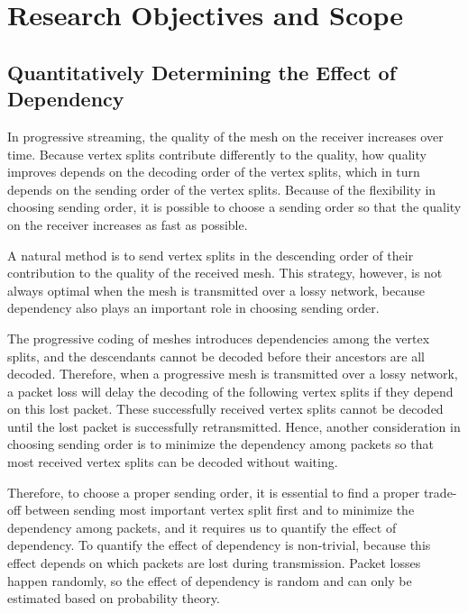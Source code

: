 \documentclass[11pt, a4paper]{report}
\begin{document}
  \section{Research Objectives and Scope}
  \label{s:intro:objectives}
    \subsection{Quantitatively Determining the Effect of Dependency}
    In progressive streaming, the quality of the mesh on the receiver
    increases over time.
    Because vertex splits contribute differently to the quality, 
    how quality improves
    depends on the decoding order of the vertex splits,
    which in turn depends on the sending order of the vertex splits.
    Because of the flexibility in choosing sending order,
    it is possible to choose a sending order so that the 
    quality on the receiver increases as fast as possible.

    A natural method is to send vertex splits in the descending order
    of their contribution to the quality of the received mesh. 
    This strategy, however, is not always optimal 
    when the mesh is transmitted over a lossy network,
    because dependency also plays an important role in choosing sending order.
    
    The progressive coding of meshes introduces dependencies among 
    the vertex splits, and the descendants cannot be decoded
    before their ancestors are all decoded. Therefore, 
    when a progressive mesh is transmitted over a lossy network,
    a packet loss will delay the decoding of the following
    vertex splits if they depend on this lost packet. 
    These successfully received vertex splits cannot be 
    decoded until the lost packet is successfully retransmitted. 
    Hence, another consideration in choosing sending order
    is to minimize the dependency among packets so that most
    received vertex splits can be decoded without waiting.
    
    Therefore, to choose a proper sending order, it is essential 
    to find a proper trade-off between sending most important vertex
    split first and to minimize the dependency among packets, and 
    it requires us to quantify the effect of dependency. 
    To quantify the effect of dependency is non-trivial, because
    this effect depends on which packets are lost during transmission.
    Packet losses happen randomly, so the effect of dependency is 
    random and can only be estimated based on probability theory.
    
\end{document}
